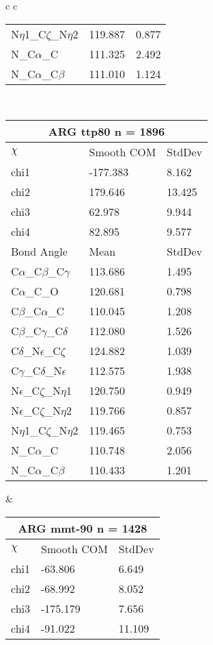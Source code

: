 \begin{longtable}{ c c }
\begin{tabular}{ l l l }
  N$\eta$1\_C$\zeta$\_N$\eta$2 & 119.887 & 0.877\\
  N\_C$\alpha$\_C & 111.325 & 2.492\\
  N\_C$\alpha$\_C$\beta$ & 111.010 & 1.124\\
  \bottomrule
  \end{tabular}
  \\
  \begin{tabular}{ l l l }
  \toprule
  \multicolumn{3}{c}{ARG \textbf{ttp80} n = 1896} \\ \toprule
  $\chi$       & Smooth COM & StdDev \\ \midrule
  chi1 & -177.383 & 8.162 \\ 
  chi2 & 179.646 & 13.425 \\ 
  chi3 & 62.978 & 9.944 \\ 
  chi4 & 82.895 & 9.577 \\ \midrule
  Bond Angle   & Mean     & StdDev \\ \midrule
  C$\alpha$\_C$\beta$\_C$\gamma$ & 113.686 & 1.495\\
  C$\alpha$\_C\_O & 120.681 & 0.798\\
  C$\beta$\_C$\alpha$\_C & 110.045 & 1.208\\
  C$\beta$\_C$\gamma$\_C$\delta$ & 112.080 & 1.526\\
  C$\delta$\_N$\epsilon$\_C$\zeta$ & 124.882 & 1.039\\
  C$\gamma$\_C$\delta$\_N$\epsilon$ & 112.575 & 1.938\\
  N$\epsilon$\_C$\zeta$\_N$\eta$1 & 120.750 & 0.949\\
  N$\epsilon$\_C$\zeta$\_N$\eta$2 & 119.766 & 0.857\\
  N$\eta$1\_C$\zeta$\_N$\eta$2 & 119.465 & 0.753\\
  N\_C$\alpha$\_C & 110.748 & 2.056\\
  N\_C$\alpha$\_C$\beta$ & 110.433 & 1.201\\
  \bottomrule
  \end{tabular}
  &
  \begin{tabular}{ l l l }
  \toprule
  \multicolumn{3}{c}{ARG \textbf{mmt-90} n = 1428} \\ \toprule
  $\chi$       & Smooth COM & StdDev \\ \midrule
  chi1 & -63.806 & 6.649 \\ 
  chi2 & -68.992 & 8.052 \\ 
  chi3 & -175.179 & 7.656 \\ 
  chi4 & -91.022 & 11.109 \\ \midrule

\end{tabular}
\end{longtable}
